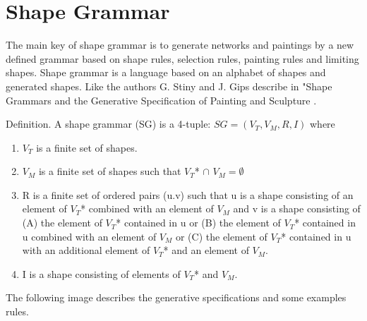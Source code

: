 \documentclass[11pt, a4paper]{report}
\begin{document}
\section{Shape Grammar}
The main key of shape grammar is to generate networks and paintings by a new defined grammar based on shape rules, selection rules, painting rules and limiting shapes. Shape grammar is a language based on an alphabet of shapes and generated shapes. Like the authors G. Stiny and J. Gips describe in "Shape Grammars and the Generative Specification of Painting and Sculpture  \citep{shapeGrammars:1972}.
\begin{displayquote}
    Definition. A shape grammar (SG) is a 4-tuple: $SG = (V_T, V_M, R, I)$ where
    \begin{enumerate}
        \item $V_T$ is a finite set of shapes.
        \item $V_M$ is a finite set of shapes such that $V_T $* $\cap$  $V_M = \emptyset$
        \item R is a finite set of ordered pairs (u.v) such that u is a shape consisting of an element of $V_T $* combined with an element of $V_M$ and v is a shape consisting of (A) the element of $V_T $* contained in u or (B) the element of $V_T $* contained in u combined with an element of $V_M$ or (C) the element of $V_T $* contained in u with an additional element of $V_T$* and an element of $V_M$.
        \item I is a shape consisting of elements of $V_T $* and $V_M$.
    \end{enumerate}
\end{displayquote}
The following image describes the generative specifications and some examples rules.
\pagebreak
\end{document}

